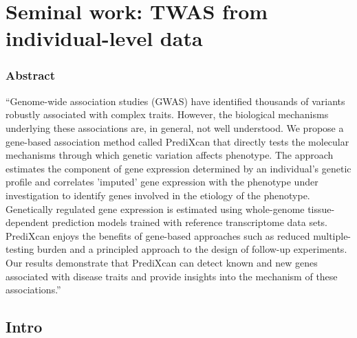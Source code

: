 \documentclass[../main.tex]{subfiles}
\begin{document}
\chapter{Seminal work: TWAS from individual-level data}

\subsection{Abstract}

\enquote{\footnotesize Genome-wide association studies (GWAS) have 
	identified thousands of variants robustly associated with complex 
	traits. However, the biological mechanisms underlying these 
	associations are, in general, not well understood. We propose a 
	gene-based association method called PrediXcan that directly tests 
	the molecular mechanisms through which genetic variation affects 
	phenotype. The approach estimates the component of gene expression 
	determined by an individual's genetic profile and correlates 
	'imputed' gene expression with the phenotype under investigation to 
	identify genes involved in the etiology of the phenotype. 
	Genetically regulated gene expression is estimated using 
	whole-genome tissue-dependent prediction models trained with 
	reference transcriptome data sets. PrediXcan enjoys the benefits of 
	gene-based approaches such as reduced multiple-testing burden and a 
	principled approach to the design of follow-up experiments. Our 
	results demonstrate that PrediXcan can detect known and new genes 
	associated with disease traits and provide insights into the 
	mechanism of these associations.}

\section{Intro}
\end{document}
